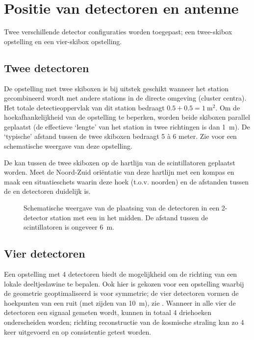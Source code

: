 \section{Positie van detectoren en \gps antenne}

Twee verschillende \hisparc detector configuraties worden toegepast; een
twee-skibox opstelling en een vier-skibox opstelling. 


\subsection{Twee detectoren}

De opstelling met twee skiboxen is bij uitstek geschikt wanneer het
station gecombineerd wordt met andere stations in de directe omgeving
(cluster centra). Het totale detectieoppervlak van dit station bedraagt
$0.5 + 0.5 = \SI{1}{\square\meter}$. Om de hoekafhankelijkheid van de
opstelling te beperken, worden beide skiboxen parallel geplaatst (de
effectieve ‘lengte’ van het station in twee richtingen is dan
\SI{1}{\meter}). De ‘typische’ afstand tussen de twee skiboxen bedraagt
5 à 6 meter. Zie  voor een schematische
weergave van deze opstelling.

De \gps kan tussen de twee skiboxen op de hartlijn van de scintillatoren
geplaatst worden. Meet de Noord-Zuid oriëntatie van deze hartlijn met
een kompas en maak een situatieschets waarin deze hoek (t.o.v. noorden)
en de afstanden tussen de \gps en detectoren duidelijk is.

\begin{figure}
    \centering
    
    \caption{Schematische weergave van de plaatsing van de detectoren in een
             2-detector station met een \gps in het midden. De afstand
             tussen de scintillatoren is ongeveer \SI{6}{\meter}.}
    \label{fig:station-2-layout}
\end{figure}


\subsection{Vier detectoren}

Een opstelling met 4 detectoren biedt de mogelijkheid om de richting van
een lokale deeltjeslawine te bepalen. Ook hier is gekozen voor een
opstelling waarbij de geometrie geoptimaliseerd is voor symmetrie; de
vier detectoren vormen de hoekpunten van een ruit (met zijden van
\SI{10}{\meter}), zie . Wanneer in alle
vier de detectoren een signaal gemeten wordt, kunnen in totaal 4
driehoeken onderscheiden worden; richting reconstructie van de kosmische
straling kan zo 4 keer uitgevoerd en op consistentie getest worden.

